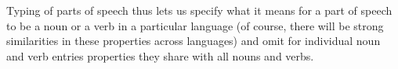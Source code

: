 \documentclass[output=paper
 	        ,biblatex
                ,babelshorthands
                ,newtxmath
                ,draftmode
                ,colorlinks, citecolor=brown
]{langscibook}
\begin{document}
Typing of parts of speech thus lets us specify what it means for a part of speech to be a noun or a verb in a particular language (of course, there will be strong similarities in these properties across languages) and omit for individual noun and verb entries properties they share with all nouns and verbs.




\end{document}
